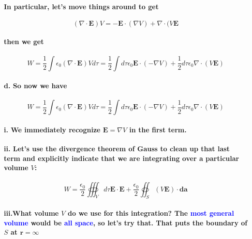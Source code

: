\documentclass{article}
\begin{document}
\paragraph{\indent In particular, let's move things around to get}
\begin{equation*}
    (\nabla\cdot \boldsymbol{E})V=-\boldsymbol{E}\cdot(\nabla V)+\nabla\cdot(V\boldsymbol{E}
\end{equation*}
\paragraph{\indent then we get}
\begin{equation*}
    W=\frac{1}{2}\int \epsilon_0(\nabla\cdot\boldsymbol{E})Vd\tau=\frac{1}{2}\int d\tau \epsilon_0\boldsymbol{E}\cdot(-\nabla V)+\frac{1}{2}d\tau \epsilon_0\nabla\cdot(V\boldsymbol{E})
\end{equation*}
\paragraph{\indent d. So now we have}
\begin{equation*}
    W=\frac{1}{2}\int \epsilon_0(\nabla\cdot\boldsymbol{E})Vd\tau=\frac{1}{2}\int d\tau \epsilon_0\boldsymbol{E}\cdot(-\nabla V)+\frac{1}{2}d\tau \epsilon_0\nabla\cdot(V\boldsymbol{E})
\end{equation*}
\paragraph{\indent i. We immediately recognize $\boldsymbol{E}=\nabla V$ in the first term.}
\paragraph{\indent ii. Let's use the divergence theorem of Gauss to clean up that last term and explicitly indicate that we are integrating over a particular volume $V$:}
\begin{equation*}
    W=\frac{\epsilon_0}{2}\oiiint_V d\tau \boldsymbol{E\cdot E}+\frac{\epsilon_0}{2}\oiint_S (V\boldsymbol{E})\cdot \boldsymbol{da}
\end{equation*}
\paragraph{\indent iii.What volume $V$ do we use for this integration? The \textcolor{blue}{most general volume} would be \textcolor{blue}{all space}, so let's try that. That puts the boundary of $S$ at $\boldsymbol{r}=\infty$}
\end{document}
